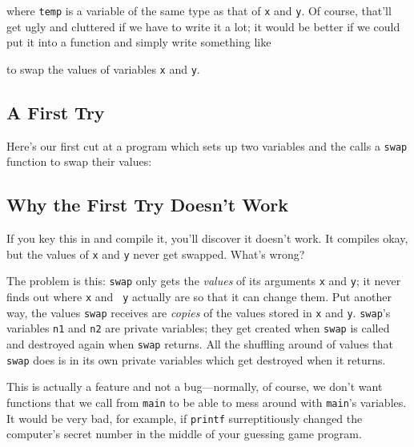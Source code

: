 \begin{flushleft}
\verb% temp = x; %
\verb% x = y; %
\verb% y = temp; %
\end{flushleft}

\noindent where {\tt temp} is a variable of the same type as that of
{\tt x} and {\tt y}.  Of course, that'll get ugly and cluttered if we
have to write it a lot; it would be better if we could put it into a
function and simply write something like

\begin{flushleft}
\verb% swap(x,y); %
\end{flushleft}

\noindent to swap the values of variables {\tt x} and {\tt y}.  

\subsection{A First Try}

Here's our first cut at a program which sets up two variables and the
calls a {\tt swap} function to swap their values:



\subsection{Why the First Try Doesn't Work}

If you key this in and compile it, you'll discover it doesn't work.  It
compiles okay, but the values of {\tt x} and {\tt y} never get swapped.
What's wrong?

The problem is this: {\tt swap} only gets the {\em values}\/ of its
arguments {\tt x} and {\tt y}; it never finds out where {\tt x} and {\tt
y} actually are so that it can change them.  Put another way, the values
{\tt swap} receives are {\em copies}\/ of the values stored in {\tt x}
and {\tt y}.  {\tt swap}'s variables {\tt n1} and {\tt n2} are private
variables; they get created when {\tt swap} is called and destroyed
again when {\tt swap} returns.  All the shuffling around of values
that {\tt swap} does is in its own private variables which get
destroyed when it returns.

This is actually a feature and not a bug---normally, of course, we don't
want functions that we call from {\tt main} to be able to mess around
with {\tt main}'s variables.  It would be very bad, for example, if
{\tt printf} surreptitiously changed the computer's secret number in
the middle of your guessing game program.

